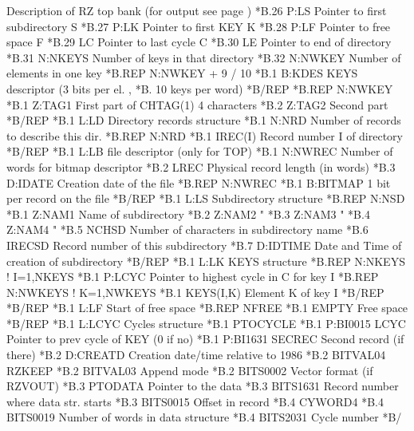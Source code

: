 \begin{XMPt}{Description of RZ top bank (for output see page \pageref{xmp:rztop})}
*B.26    P:LS          Pointer to first subdirectory S          
*B.27    P:LK          Pointer to first KEY   K                 
*B.28    P:LF          Pointer to free space  F                 
*B.29    LC            Pointer to last cycle  C                 
*B.30    LE            Pointer to end of directory              
*B.31    N:NKEYS       Number of keys in that directory         
*B.32    N:NWKEY       Number of elements in one key 
*B.REP                 N:NWKEY + 9 / 10           
*B.1     B:KDES        KEYS descriptor (3 bits per el. ,
*B.                    10 keys per word) 
*B/REP    
*B.REP               N:NWKEY           
*B.1     Z:TAG1       First part of CHTAG(1) 4 characters      
*B.2     Z:TAG2       Second part                              
*B/REP    
*B.1     L:LD          Directory records structure
*B.1     N:NRD         Number of records to describe this dir.  
*B.REP               N:NRD           
*B.1     IREC(I)       Record number I of directory             
*B/REP
*B.1     L:LB          file descriptor (only for TOP)
*B.1     N:NWREC       Number of words for bitmap descriptor      
*B.2     LREC          Physical record length (in words)          
*B.3     D:IDATE       Creation date of the file                  
*B.REP               N:NWREC            
*B.1     B:BITMAP      1 bit per record on the file                       
*B/REP
*B.1     L:LS          Subdirectory  structure
*B.REP               N:NSD            
*B.1     Z:NAM1        Name of subdirectory                   
*B.2     Z:NAM2        "                                          
*B.3     Z:NAM3        "                                          
*B.4     Z:NAM4        "                                          
*B.5     NCHSD         Number of characters in subdirectory name  
*B.6     IRECSD        Record number of this subdirectory         
*B.7     D:IDTIME      Date and Time of creation of subdirectory  
*B/REP
*B.1     L:LK          KEYS structure
*B.REP               N:NKEYS        ! I=1,NKEYS   
*B.1     P:LCYC        Pointer to highest cycle in C for key I
*B.REP               N:NWKEYS       ! K=1,NWKEYS 
*B.1     KEYS(I,K)     Element K of key I                     
*B/REP
*B/REP
*B.1     L:LF          Start of free space
*B.REP   NFREE
*B.1     EMPTY         Free space
*B/REP
*B.1     L:LCYC        Cycles structure
*B.1     PTOCYCLE       
*B.1     P:BI0015      LCYC Pointer to prev cycle of KEY (0 if no)
*B.1     P:BI1631      SECREC Second record (if there)
*B.2     D:CREATD      Creation date/time relative to 1986
*B.2     BITVAL04      RZKEEP
*B.2     BITVAL03      Append mode
*B.2     BITS0002      Vector format (if RZVOUT)
*B.3     PTODATA       Pointer to the data
*B.3     BITS1631      Record number where data str. starts
*B.3     BITS0015      Offset in record
*B.4     CYWORD4       
*B.4     BITS0019      Number of words in data structure
*B.4     BITS2031      Cycle number
*B/
\end{XMPt} 
 
